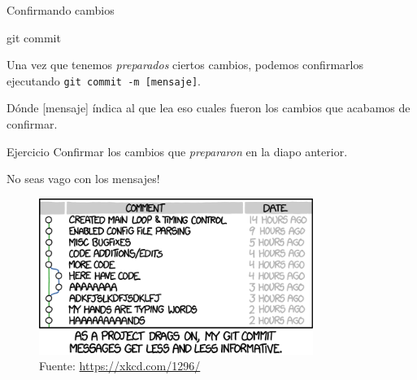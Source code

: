 \begin{frame}[t]{Confirmando cambios}
    \begin{comando}
        git commit
    \end{comando}

    \pause
    \begin{block}{}
        Una vez que tenemos \textit{preparados} ciertos cambios, podemos confirmarlos
        ejecutando \texttt{git commit -m [mensaje]}.

        \vspace{0.5em}

        Dónde [mensaje] índica al que lea eso cuales fueron los cambios que acabamos de confirmar.
    \end{block}

    \pause
    \vspace{1em}
    \begin{ejercicio}{Ejercicio}
        Confirmar los cambios que \textit{prepararon} en la diapo anterior.
    \end{ejercicio}
\end{frame}

\begin{frame}[t]{No seas vago con los mensajes!}

    \begin{figure}[ht]
        \begin{center}
            \includegraphics[height=2in]{images/xkcd-git-commit.png}
        \end{center}
        \caption{Fuente: \url{https://xkcd.com/1296/}}
    \end{figure}

\end{frame}

